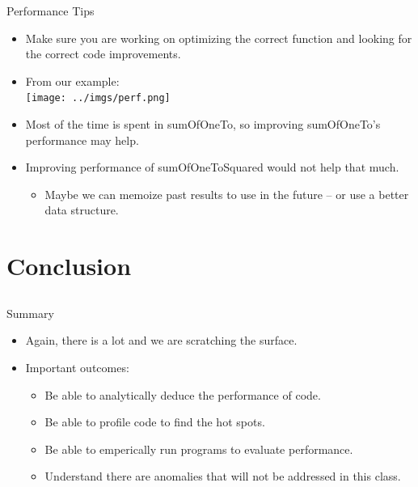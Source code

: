 \documentclass{beamer}
\begin{document}

\begin{frame}{Performance Tips}
\begin{itemize}
\item Make sure you are working on optimizing the correct function and looking for the correct code improvements.
\item From our example:\\
\texttt{[image: ../imgs/perf.png]}
\item Most of the time is spent in sumOfOneTo, so improving sumOfOneTo's performance may help.
\item Improving performance of sumOfOneToSquared would not help that much.
\begin{itemize}
\item Maybe we can memoize past results to use in the future -- or use a better data structure.
\end{itemize}
\end{itemize}
\end{frame}

\section{Conclusion}
\subsection{}

\begin{frame}{Summary}
\begin{itemize}
\item Again, there is a lot and we are scratching the surface.
\item Important outcomes:
\begin{itemize}
\item Be able to analytically deduce the performance of code.
\item Be able to profile code to find the hot spots.
\item Be able to emperically run programs to evaluate performance.
\item Understand there are anomalies that will not be addressed in this class.
\end{itemize}
\end{itemize}
\end{frame}
\end{document}
